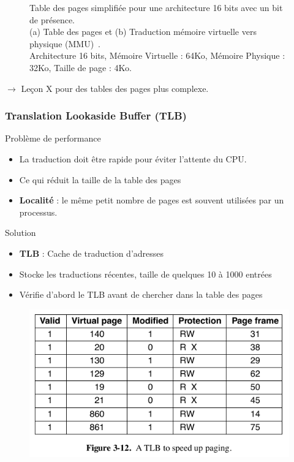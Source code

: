 \documentclass[8pt]{beamer}
\begin{document}
\begin{frame}
\begin{figure}
\begin{minipage}[b]{0.5\linewidth}
            \subcaption{}
            \label{fig:page_mapping}
        \end{minipage}
        \caption{Table des pages simplifiée pour une architecture 16 bits avec
            un bit de
            pr\'esence. \\ (a) Table des pages et (b) Traduction mémoire
            virtuelle vers
            physique (MMU)~\cite{tanenbaum2009modern}. \\
            Architecture 16 bits,
            Mémoire Virtuelle : 64Ko, Mémoire Physique : 32Ko,
            Taille de page : 4Ko. \\
        }
    \end{figure}
    $\to$ Le\c{c}on X pour des tables des pages plus complexe.

\end{frame}

\begin{frame}
    \frametitle{Translation Lookaside Buffer (TLB)}

    \begin{alertblock}{Problème de performance}
        \begin{itemize}
            \item La traduction doit \^etre rapide pour \'eviter
                  l'attente du
                  CPU.
            \item Ce qui r\'eduit la taille de la table des pages
            \item \textbf{Localité} : le même petit nombre de pages est souvent
                  utilisées par un processus.
        \end{itemize}
    \end{alertblock}
    \begin{exampleblock}{Solution}
        \begin{itemize}
            \item \textbf{TLB} : Cache de traduction d'adresses
            \item Stocke les traductions récentes, taille de quelques 10 à 1000
                  entrées
            \item Vérifie d'abord le TLB avant de chercher dans la table des
                  pages
        \end{itemize}
    \end{exampleblock}
    \begin{figure}
        \centering
        \includegraphics[width=.35\textwidth]{figures/TLB.png}
    \end{figure}
\end{frame}
\end{document}

